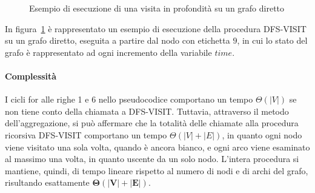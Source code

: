 \begin{figure}
    
    \caption{Esempio di esecuzione di una visita in profondit\`a su un grafo diretto}
    \label{fig:dfs-example}
\end{figure}

In figura~\ref{fig:dfs-example} \`e rappresentato un esempio di esecuzione della procedura DFS-VISIT su un grafo
diretto, eseguita a partire dal nodo con etichetta $9$, in cui lo stato del grafo \`e rappresentato ad ogni
incremento della variabile $time$.

\paragraph{Complessità}
I cicli for alle righe 1 e 6 nello pseudocodice comportano un tempo $\Theta(|V|)$ se non tiene conto della chiamata a
DFS-VISIT. Tuttavia, attraverso il metodo dell'aggregazione, si può affermare che la totalità delle chiamate alla
procedura ricorsiva DFS-VISIT comportano un tempo $\Theta(|V| + |E|)$, in quanto ogni nodo viene visitato una sola
volta, quando è ancora bianco, e ogni arco viene esaminato al massimo una volta, in quanto uscente da un solo
nodo.
L'intera procedura si mantiene, quindi, di tempo lineare rispetto al numero di nodi e di archi del grafo,
risultando esattamente $\mathbf{\Theta(|V| + |E|)}$.